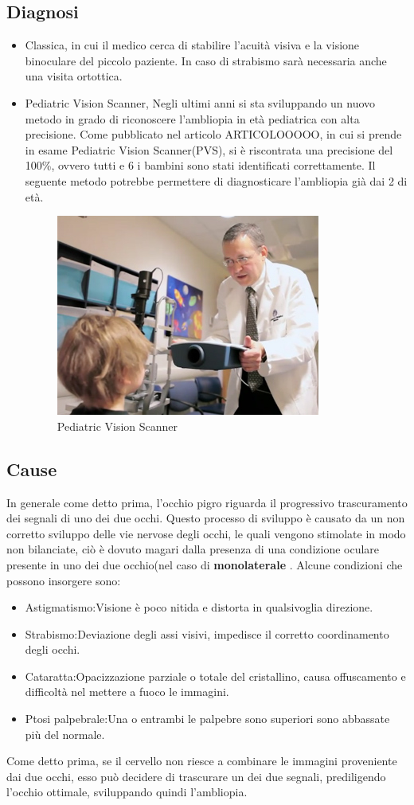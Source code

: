 \documentclass[10pt,a4paper]{article}
\begin{document}
	\subsection{Diagnosi}
	\begin{itemize}
		\item Classica, in cui il medico cerca di stabilire l'acuità visiva e la visione binoculare del piccolo paziente. In caso di strabismo sarà necessaria anche una visita ortottica.
		\item Pediatric Vision Scanner, Negli ultimi anni si sta sviluppando un nuovo metodo in grado di riconoscere l'ambliopia in età pediatrica con alta precisione.
		Come pubblicato nel articolo 	ARTICOLOOOOO, in cui si prende in esame Pediatric Vision Scanner(PVS), si è riscontrata una precisione del 100\%, ovvero tutti e 6 i bambini sono stati identificati correttamente.
		Il seguente metodo potrebbe permettere di diagnosticare l'ambliopia già dai 2 di età.
		\begin{figure}[h]
			\centering
			\includegraphics[width=0.6\linewidth]{image/pvs}
			\caption{Pediatric Vision Scanner}
			\label{fig:pvs}
		\end{figure}
	\end{itemize}
	\subsection{Cause}
	In generale come detto prima, l'occhio pigro riguarda il progressivo trascuramento dei segnali di uno dei due occhi.
	Questo processo di sviluppo è causato da un non corretto sviluppo delle vie nervose degli occhi, le quali vengono stimolate in modo non bilanciate, ciò è dovuto magari dalla presenza di una condizione oculare presente in uno dei due occhio(nel caso di \textbf{monolaterale }.
	Alcune condizioni che possono insorgere sono:
	\begin{itemize}
		\item Astigmatismo:Visione è poco nitida e distorta in qualsivoglia direzione.
		\item Strabismo:Deviazione degli assi visivi, impedisce il corretto coordinamento degli occhi. 
		\item Cataratta:Opacizzazione parziale o totale del cristallino,  causa offuscamento e difficoltà nel mettere a fuoco le immagini.
		\item Ptosi palpebrale:Una o entrambi le palpebre sono superiori sono abbassate più del normale.
	\end{itemize}
	Come detto prima, se il cervello non riesce a combinare le immagini proveniente dai due occhi, esso può decidere di trascurare un dei due segnali, prediligendo l'occhio ottimale, sviluppando quindi l'ambliopia.
\end{document}
